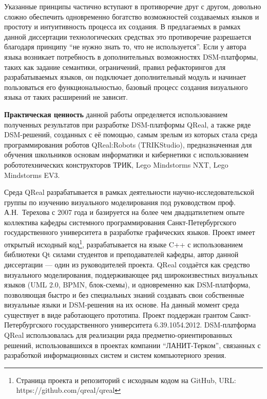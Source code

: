 Указанные принципы частично вступают в противоречие друг с другом, довольно 
сложно обеспечить одновременно богатство возможностей создаваемых языков и 
простоту и интуитивность процесса их создания. В предлагаемых в рамках данной 
диссертации технологических средствах это противоречие разрешается благодаря 
принципу "`не нужно знать то, что не используется"'. Если у автора языка 
возникает потребность в дополнительных возможностях DSM-платформы, таких как 
задание семантики, ограничений, правил рефакторингов для разрабатываемых языков, 
он подключает дополнительный модуль и начинает пользоваться его 
функциональностью, базовый процесс создания визуального языка от таких 
расширений не зависит.

\textbf{Практическая ценность} данной работы определяется использованием полученных 
результатов при разработке DSM-платформы QReal, а также ряде DSM-решений, созданных с её помощью, 
самым зрелым из которых стала среда программирования роботов QReal:Robots (TRIKStudio), 
предназначенная для обучения школьников основам информатики и кибернетики с использованием робототехнических 
конструкторов ТРИК, Lego Mindstorms NXT, Lego Mindstorms EV3.

Среда QReal разрабатывается в рамках деятельности научно-исследовательской 
группы по изучению визуального моделирования под руководством проф. 
А.Н.~Терехова с 2007 года и базируется на более чем двадцатилетнем опыте 
коллектива кафедры системного программирования Санкт-Петербургского 
государственного университета в разработке графических языков. 
Проект имеет открытый исходный код\footnote{Страница проекта и репозиторий с исходным кодом на GitHub, URL: https://github.com/qreal/qreal}, 
разрабатывается на языке C++ с использованием библиотеки Qt силами студентов и преподавателей кафедры, автор 
данной диссертации --- один из руководителей проекта. QReal создаётся как 
средство визуального моделирования, поддерживающее ряд широкоизвестных 
визуальных языков (UML 2.0, BPMN, блок-схемы), и одновременно как DSM-платформа, 
позволяющая быстро и без специальных знаний создавать свои собственные 
визуальные языки и DSM-решения на их основе. На данный момент среда существует 
в виде работающего прототипа. Проект поддержан грантом Санкт-Петербургского 
государственного университета 6.39.1054.2012. DSM-платформа QReal использовалась
 для реализации ряда предметно-ориентированных решений, использовавшихся в 
проектах компании "`ЛАНИТ-Терком"', связанных с разработкой информационных систем 
и систем компьютерного зрения.

